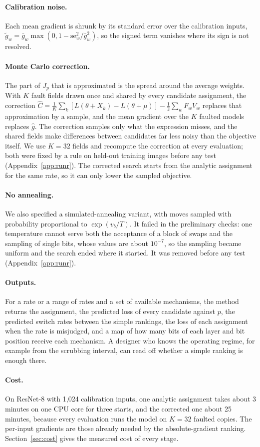 \paragraph{Calibration noise.} Each mean gradient is shrunk by its standard error over the calibration inputs, $\tilde g_w=\bar g_w\max(0,1-\mathrm{se}_w^2/\bar g_w^2)$, so the signed term vanishes where its sign is not resolved.

\paragraph{Monte Carlo correction.} The part of $\hat J_p$ that is approximated is the spread around the average weights. With $K$ fault fields drawn once and shared by every candidate assignment, the correction $\hat C=\frac1K\sum_k[L(\theta+X_k)-L(\theta+\mu)]-\tfrac12\sum_wF_wV_w$ replaces that approximation by a sample, and the mean gradient over the $K$ faulted models replaces $\hat g$. The correction samples only what the expression misses, and the shared fields make differences between candidates far less noisy than the objective itself. We use $K=32$ fields and recompute the correction at every evaluation; both were fixed by a rule on held-out training images before any test (Appendix~\ref{app:runr}). The corrected search starts from the analytic assignment for the same rate, so it can only lower the sampled objective.

\paragraph{No annealing.} We also specified a simulated-annealing variant, with moves sampled with probability proportional to $\exp(v_b/T)$. It failed in the preliminary checks: one temperature cannot serve both the acceptance of a block of swaps and the sampling of single bits, whose values are about $10^{-7}$, so the sampling became uniform and the search ended where it started. It was removed before any test (Appendix~\ref{app:runr}).

\paragraph{Outputs.} For a rate or a range of rates and a set of available mechanisms, the method returns the assignment, the predicted loss of every candidate against $p$, the predicted switch rates between the simple rankings, the loss of each assignment when the rate is misjudged, and a map of how many bits of each layer and bit position receive each mechanism. A designer who knows the operating regime, for example from the scrubbing interval, can read off whether a simple ranking is enough there.

\paragraph{Cost.} On ResNet-8 with 1,024 calibration inputs, one analytic assignment takes about 3 minutes on one CPU core for three starts, and the corrected one about 25 minutes, because every evaluation runs the model on $K=32$ faulted copies. The per-input gradients are those already needed by the absolute-gradient ranking. Section~\ref{sec:cost} gives the measured cost of every stage.
